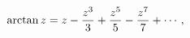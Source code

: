 \[\mathop{\mathrm{arctan}\/}\nolimits z=z-\frac{z^{3}}{3}+\frac{z^{5}}{5}-\frac{%
z^{7}}{7}+\cdots,\]